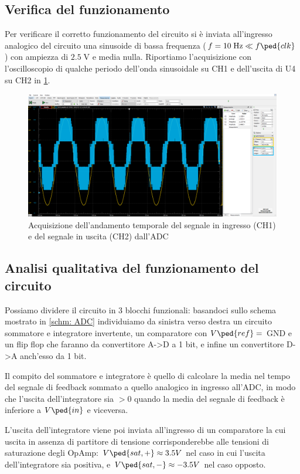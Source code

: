 \documentclass[10pt, a4paper, italian]{article}
\begin{document}
\subsection{Verifica del funzionamento}
Per verificare il corretto funzionamento del circuito si è inviata all'ingresso
analogico del circuito una sinusoide di bassa frequenza ($f = 10 \; \si{\Hz}
 \ll f\ped{clk}$) con ampiezza di $2.5 \; \si{\V}$ e media nulla.
Riportiamo l'acquisizione con l'oscilloscopio di qualche periodo dell'onda
sinusoidale su CH1 e dell'uscita di U4 su CH2 in \cref{fig: verif}.
\begin{figure}[htbp]
    \centering
	\includegraphics[width=\textwidth]{sin10hz2.5v}
    \caption{Acquisizione dell'andamento temporale del segnale in ingresso
    (CH1) e del segnale in uscita (CH2) dall'ADC
    \label{fig: verif}}
\end{figure}

\subsection{Analisi qualitativa del funzionamento del circuito}
Possiamo dividere il circuito in 3 blocchi funzionali: basandoci sullo schema
mostrato in \cref{schm: ADC} individuiamo da sinistra verso destra un circuito
sommatore e integratore invertente, un comparatore con $V\ped{ref} =$ GND e un
flip flop che faranno da convertitore A->D a 1 bit, e infine un convertitore
D->A anch'esso da 1 bit.

Il compito del sommatore e integratore è quello di calcolare la media nel
tempo del segnale di feedback sommato a quello analogico in ingresso all'ADC,
in modo che l'uscita dell'integratore sia $>0$ quando la media del segnale di
feedback è inferiore a $V\ped{in}$ e viceversa.

L'uscita dell'integratore viene poi inviata all'ingresso di un comparatore la
cui uscita in assenza di partitore di tensione corrisponderebbe alle tensioni
di saturazione degli OpAmp: $V\ped{sat,+} \approx 3.5 V$ nel caso in cui
l'uscita dell'integratore sia positiva, e $V\ped{sat,-} \approx -3.5 V$ nel
caso opposto.
\end{document}

